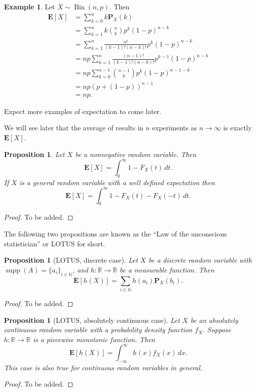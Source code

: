 \documentclass[11pt,a4paper]{article}
\theoremstyle{definition}
\newtheorem{example}{Example}[section]
\theoremstyle{plain}
\newtheorem{proposition}[theorem]{Proposition}
\DeclareMathOperator{\supp}{supp}
\DeclareMathOperator{\Bin}{Bin}
\newcommand{\N}{\mathbb{N}}
\newcommand{\R}{\mathbb{R}}
\newcommand{\E}{\mathbf{E}}
\newcommand{\Prob}{\mathbf{P}}
\begin{document}
  \begin{example}
    Let $X \sim \Bin(n,p)$. Then
    \begin{align*}
      \E[X] &= \sum_{k=0}^{n} k \Prob_{X}(k) \\
      &= \sum_{k=1}^{n} k \binom{n}{k} p^k (1-p)^{n-k} \\
      &= \sum_{k=1}^{n} \frac{n!}{(k-1)!(n-k)!} p^{k} (1-p)^{n-k} \\
      &= n p \sum_{k=1}^{n} \frac{(n-1)!}{(k-1)!(n-k)!} p^{k-1} (1-p)^{n-k} \\
      &= n p\sum_{k=0}^{n-1}{\binom{n-1}{k}}p^{k}(1-p)^{n-1-k} \\
      &= n p(p+(1-p))^{n-1} \\
      &= n p.
    \end{align*}
  \end{example}

  Expect more examples of expectation to come later.

  We will see later that the average of results in $n$ experiments as
  $n \to \infty$ is exactly $\E[X]$.

  \begin{proposition}
    Let $X$ be a nonnegative random variable. Then
    \[
      \E[X] = \int_{0}^{\infty} 1 - F_X(t)\,dt.
    \]
    If $X$ is a general random variable with a well defined expectation
    then
    \[
      \E[X] = \int_{0}^{\infty} 1 - F_X(t) - F_X(-t)\,dt.
    \]
  \end{proposition}
  \begin{proof}
    To be added.
  \end{proof}

  The following two propositions are known as the 
  ``Law of the unconscious statistician'' or LOTUS for short.
  \begin{proposition}[LOTUS, discrete case]
    Let $X$ be a discrete random variable with $\supp(A) = \{a_i\}_{i \in \N}$,
    and $h \colon \R \to \R$ be a measurable function. Then
    \[
      \E[h(X)] = \sum_{i \in \N} h(a_i) \Prob_X(b_i).
    \]
  \end{proposition}
  \begin{proof}
    To be added.
  \end{proof}
  
  \begin{proposition}[LOTUS, absolutely continuous case]
    Let $X$ be an absolutely continuous random variable with a probability
    density function $f_X$.
    Suppose $h \colon \R \to \R$ is a piecewise monotonic function. Then
    \[
      \E[h(X)] = \int_{-\infty}^{\infty} h(x) f_X(x)\,dx.
    \]
    This case is also true for continuous random variables in general.
  \end{proposition}
  \begin{proof}
    To be added.
  \end{proof}
  
\end{document}
